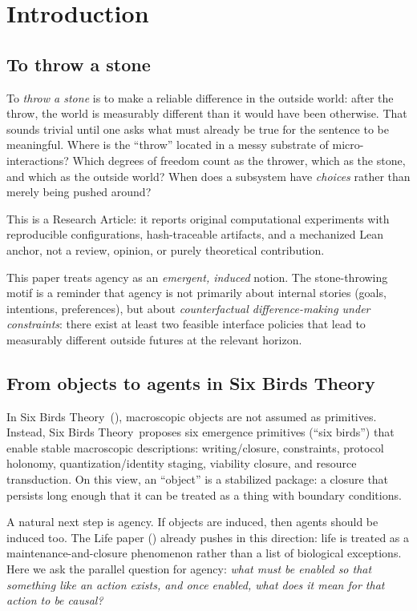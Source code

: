 \documentclass[11pt]{article}
\newcommand{\SBT}{Six Birds Theory}
\begin{document}
\section{Introduction}
\label{sec:introduction}

\subsection{To throw a stone}
To \emph{throw a stone} is to make a reliable difference in the outside world: after the throw, the world is measurably different than it would have been otherwise. That sounds trivial until one asks what must already be true for the sentence to be meaningful. Where is the ``throw'' located in a messy substrate of micro-interactions? Which degrees of freedom count as the thrower, which as the stone, and which as the outside world? When does a subsystem have \emph{choices} rather than merely being pushed around?

This is a Research Article: it reports original computational experiments with reproducible configurations, hash-traceable artifacts, and a mechanized Lean anchor, not a review, opinion, or purely theoretical contribution.

This paper treats agency as an \emph{emergent, induced} notion. The stone-throwing motif is a reminder that agency is not primarily about internal stories (goals, intentions, preferences), but about \emph{counterfactual difference-making under constraints}: there exist at least two feasible interface policies that lead to measurably different outside futures at the relevant horizon.

\subsection{From objects to agents in \SBT}
In \SBT\ (\citep{six_birds_theory}), macroscopic objects are not assumed as primitives. Instead, \SBT\ proposes six emergence primitives (``six birds'') that enable stable macroscopic descriptions: writing/closure, constraints, protocol holonomy, quantization/identity staging, viability closure, and resource transduction. On this view, an ``object'' is a stabilized package: a closure that persists long enough that it can be treated as a thing with boundary conditions.

A natural next step is agency. If objects are induced, then agents should be induced too. The Life paper (\citep{six_birds_life}) already pushes in this direction: life is treated as a maintenance-and-closure phenomenon rather than a list of biological exceptions. Here we ask the parallel question for agency: \emph{what must be enabled so that something like an action exists, and once enabled, what does it mean for that action to be causal?}
\end{document}
